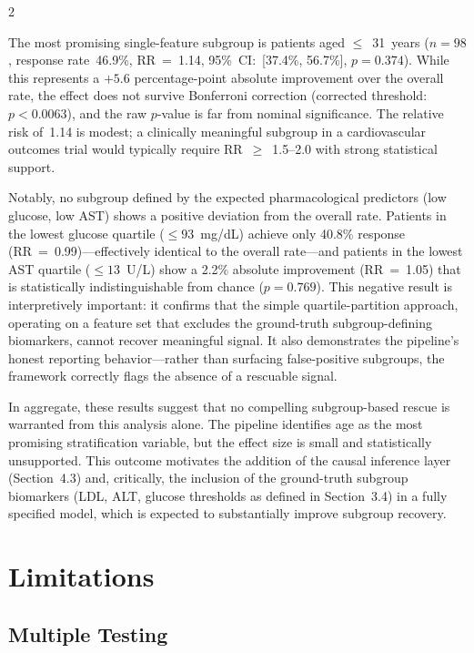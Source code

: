\documentclass[12pt]{article}
\begin{document}
\begin{multicols}{2}

\noindent The most promising single-feature subgroup is patients aged $\leq$~31~years
($n = 98$, response rate~46.9\%, RR~=~1.14, 95\%~CI:~[37.4\%,
56.7\%], $p = 0.374$).  While this represents a $+5.6$ percentage-point
absolute improvement over the overall rate, the effect does not survive
Bonferroni correction (corrected threshold: $p < 0.0063$), and the raw
$p$-value is far from nominal significance.  The relative risk of~1.14
is modest; a clinically meaningful subgroup in a cardiovascular outcomes
trial would typically require RR~$\geq$~1.5--2.0 with strong statistical
support.

Notably, no subgroup defined by the expected pharmacological predictors
(low glucose, low AST) shows a positive deviation from the overall rate.
Patients in the lowest glucose quartile ($\leq 93$~mg/dL) achieve only
40.8\% response (RR~=~0.99)---effectively identical to the overall
rate---and patients in the lowest AST quartile ($\leq 13$~U/L) show a
2.2\% absolute improvement (RR~=~1.05) that is statistically
indistinguishable from chance ($p = 0.769$).  This negative result is
interpretively important: it confirms that the simple quartile-partition
approach, operating on a feature set that excludes the ground-truth
subgroup-defining biomarkers, cannot recover meaningful signal.  It also
demonstrates the pipeline's honest reporting behavior---rather than
surfacing false-positive subgroups, the framework correctly flags the
absence of a rescuable signal.

In aggregate, these results suggest that no compelling subgroup-based rescue
is warranted from this analysis alone.  The pipeline identifies age as the
most promising stratification variable, but the effect size is small and
statistically unsupported.  This outcome motivates the addition of the causal
inference layer (Section~4.3) and, critically, the inclusion of the
ground-truth subgroup biomarkers (LDL, ALT, glucose thresholds as defined
in Section~3.4) in a fully specified model, which is expected to substantially
improve subgroup recovery.

\section{Limitations}

\subsection{Multiple Testing}


\end{multicols}
\end{document}
